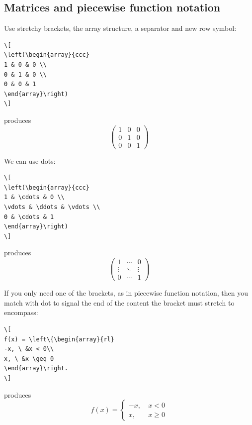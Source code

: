 \documentclass[a4paper,14pt]{extarticle}
\begin{document}
\subsection{Matrices and piecewise function notation}

Use stretchy brackets, the array structure, a separator and new row symbol:
\begin{verbatim}
\[
\left(\begin{array}{ccc}
1 & 0 & 0 \\
0 & 1 & 0 \\
0 & 0 & 1 
\end{array}\right)
\]
\end{verbatim}
produces
\[
\left(\begin{array}{ccc}
1 & 0 & 0 \\
0 & 1 & 0 \\
0 & 0 & 1 
\end{array}\right)
\]

We can use dots:
\begin{verbatim}
\[
\left(\begin{array}{ccc}
1 & \cdots & 0 \\
\vdots & \ddots & \vdots \\
0 & \cdots & 1
\end{array}\right)
\]
\end{verbatim}
produces
\[
\left(\begin{array}{ccc}
1 & \cdots & 0 \\
\vdots & \ddots & \vdots \\
0 & \cdots & 1
\end{array}\right)
\]

If you only need one of the brackets, as in piecewise function notation, then you match with dot to signal the end of the content the bracket must stretch to encompass:
\begin{verbatim}
\[
f(x) = \left\{\begin{array}{rl}
-x, \ &x < 0\\
x, \ &x \geq 0
\end{array}\right.
\]
\end{verbatim}
produces
\[
f(x) = \left\{\begin{array}{rl}
-x, \ &x < 0\\
x, \ &x \geq 0
\end{array}\right.
\]
\end{document}
